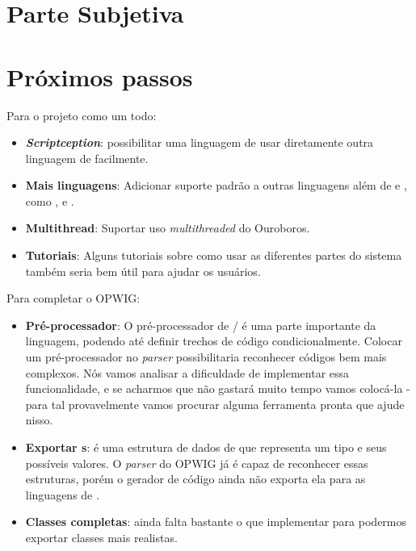 \chapter*{Parte Subjetiva}
\label{sec:parte_subjetiva}

\newcommand\materia[3]{\noindent \textbf{#1} - \texttt{#2}\\\indent #3\vspace{0.5cm}\\}





\chapter{Próximos passos}
\label{sec:proximos_passos}

Para o projeto como um todo:
\begin{itemize}
  \item \emph{\textbf{Scriptception}}: possibilitar uma linguagem de \script{} usar diretamente
    outra linguagem de \script{} facilmente.
  \item \textbf{Mais linguagens}: Adicionar suporte padrão a outras linguagens além de 
    e , como ,  e .
  \item \textbf{Multithread}: Suportar uso \textit{multithreaded} do Ouroboros.
  \item \textbf{Tutoriais}: Alguns tutoriais sobre como usar as diferentes partes do
    sistema também seria bem útil para ajudar os usuários.
\end{itemize}

Para completar o OPWIG:
\begin{itemize}
  \item \textbf{Pré-processador}: O pré-processador de \C{}/\CXX{} é uma parte 
    importante da linguagem, podendo até definir trechos de código condicionalmente.
    Colocar um pré-processador no \textit{parser} possibilitaria reconhecer
    códigos \CXX{} bem mais complexos. Nós vamos analisar a dificuldade de implementar
    essa funcionalidade, e se acharmos que não gastará muito tempo vamos colocá-la -
    para tal provavelmente vamos procurar alguma ferramenta pronta que ajude nisso.
  \item \textbf{Exportar s}:  é uma estrutura de dados de \CXX{} 
    que representa um tipo e seus possíveis valores. O \textit{parser} do OPWIG já
    é capaz de reconhecer essas estruturas, porém o gerador de código ainda não
    exporta ela para as linguagens de \script{}.
  \item \textbf{Classes completas}: ainda falta bastante o que implementar para podermos
    exportar classes mais realistas.
\end{itemize}
